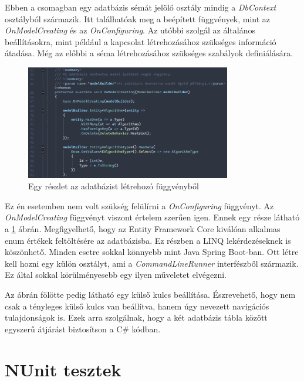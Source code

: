 \documentclass[12pt]{report} %
\begin{document}
Ebben a csomagban egy adatbázis sémát jelölő osztály mindig a \textit{DbContext} osztályból származik. Itt találhatóak meg a beépített függvények, mint az \textit{OnModelCreating} és az \textit{OnConfiguring}. Az utóbbi szolgál az általános beállításokra, mint például a kapcsolat létrehozásához szükséges információ átadása. Még az előbbi a séma létrehozásához szükséges szabályok definiálására.

\begin{figure}[H]
    \centering %
    \includegraphics[width=0.8\textwidth]{Figures/Implementation10.png} %
    \caption{Egy részlet az adatbázist létrehozó függvényből} %
    \label{fig:Implementation10} %
\end{figure}

Ez én esetemben nem volt szükség felülírni a \textit{OnConfiguring} függvényt. Az \textit{OnModelCreating} függvényt viszont értelem szerűen igen. Ennek egy része látható a \ref{fig:Implementation10} ábrán. Megfigyelhető, hogy az Entity Framework Core kiválóan alkalmas enum értékek feltöltésére az adatbázisba. Ez részben a LINQ lekérdezéseknek is köszönhető. Minden esetre sokkal könnyebb mint Java Spring Boot-ban. Ott létre kell hozni egy külön osztályt, ami a \textit{CommandLineRunner} interfészből származik. Ez által sokkal körülményesebb egy ilyen műveletet elvégezni.

Az ábrán fölötte pedig látható egy külső kulcs beállítása. Észrevehető, hogy nem csak a tényleges külső kulcs van beállítva, hanem úgy nevezett navigációs tulajdonságok is. Ezek arra szolgálnak, hogy a két adatbázis tábla között egyszerű átjárást biztosítson a C\# kódban.

\section{NUnit tesztek} %
\end{document}
